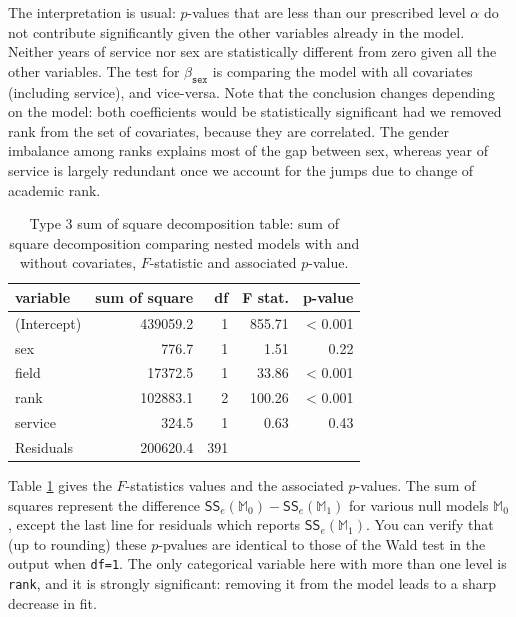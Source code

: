 \documentclass[
  11pt,
  letterpaper,
]{book}
\theoremstyle{definition}
\theoremstyle{definition}
\theoremstyle{definition}
\theoremstyle{definition}
\theoremstyle{remark}
\begin{document}
The interpretation is usual: \(p\)-values that are less than our prescribed level \(\alpha\) do not contribute significantly given the other variables already in the model. Neither years of service nor sex are statistically different from zero given all the other variables. The test for \(\beta_{\texttt{sex}}\) is comparing the model with all covariates (including service), and vice-versa. Note that the conclusion changes depending on the model: both coefficients would be statistically significant had we removed rank from the set of covariates, because they are correlated. The gender imbalance among ranks explains most of the gap between sex, whereas year of service is largely redundant once we account for the jumps due to change of academic rank.

\begin{table}

\caption{\label{tab:summaryanovalmcollege}Type 3 sum of square decomposition table: sum of square decomposition comparing nested models with and without covariates, $F$-statistic and associated $p$-value.}
\centering
\begin{tabular}[t]{lrrrr}
\toprule
variable & sum of square & df & F stat. & p-value\\
\midrule
(Intercept) & 439059.2 & 1 & 855.71 & < 0.001\\
sex & 776.7 & 1 & 1.51 & 0.22\\
field & 17372.5 & 1 & 33.86 & < 0.001\\
rank & 102883.1 & 2 & 100.26 & < 0.001\\
service & 324.5 & 1 & 0.63 & 0.43\\
\addlinespace
Residuals & 200620.4 & 391 &  & \\
\bottomrule
\end{tabular}
\end{table}

Table \ref{tab:summaryanovalmcollege} gives the \(F\)-statistics values and the associated \(p\)-values. The sum of squares represent the difference \(\mathsf{SS}_e(\mathbb{M}_0)-\mathsf{SS}_e(\mathbb{M}_1)\) for various null models \(\mathbb{M}_0\), except the last line for residuals which reports \(\mathsf{SS}_e(\mathbb{M}_1)\). You can verify that (up to rounding) these \(p\)-pvalues are identical to those of the Wald test in the output when \texttt{df=1}. The only categorical variable here with more than one level is \texttt{rank}, and it is strongly significant: removing it from the model leads to a sharp decrease in fit.
\end{document}
